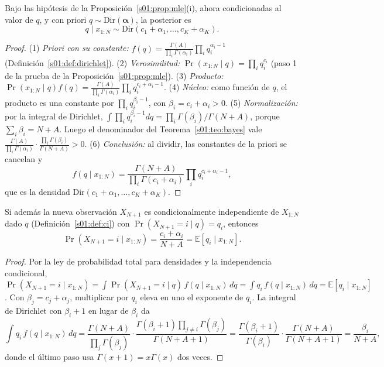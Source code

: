 \begin{proposicion}\label{s01:prop:conjugacion}
Bajo las hipótesis de la Proposición~\ref{s01:prop:mle}(i), ahora condicionadas al
valor de $q$, y con priori $q\sim\mathrm{Dir}(\boldsymbol\alpha)$, la posterior es
\[
q\mid x_{1:N}\sim\mathrm{Dir}(c_1+\alpha_1,\ldots,c_K+\alpha_K).
\]
\end{proposicion}
\begin{proof}
(1) \emph{Priori con su constante:}
$f(q)=\frac{\Gamma(A)}{\prod_i\Gamma(\alpha_i)}\prod_iq_i^{\alpha_i-1}$
(Definición~\ref{s01:def:dirichlet}).
(2) \emph{Verosimilitud:} $\Pr(x_{1:N}\mid q)=\prod_iq_i^{c_i}$ (paso 1 de la
prueba de la Proposición~\ref{s01:prop:mle}).
(3) \emph{Producto:}
$\Pr(x_{1:N}\mid q)f(q)=\frac{\Gamma(A)}{\prod_i\Gamma(\alpha_i)}\prod_iq_i^{c_i+\alpha_i-1}$.
(4) \emph{Núcleo:} como función de $q$, el producto es una constante por
$\prod_iq_i^{\beta_i-1}$, con $\beta_i=c_i+\alpha_i>0$.
(5) \emph{Normalización:} por la integral de Dirichlet,
$\int\prod_iq_i^{\beta_i-1}dq=\prod_i\Gamma(\beta_i)/\Gamma(N+A)$, porque
$\sum_i\beta_i=N+A$. Luego el denominador del Teorema~\ref{s01:teo:bayes} vale
$\frac{\Gamma(A)}{\prod_i\Gamma(\alpha_i)}\cdot\frac{\prod_i\Gamma(\beta_i)}{\Gamma(N+A)}>0$.
(6) \emph{Conclusión:} al dividir, las constantes de la priori se cancelan y
\[
f(q\mid x_{1:N})=\frac{\Gamma(N+A)}{\prod_i\Gamma(c_i+\alpha_i)}\prod_iq_i^{c_i+\alpha_i-1},
\]
que es la densidad $\mathrm{Dir}(c_1+\alpha_1,\ldots,c_K+\alpha_K)$.
\end{proof}
\begin{proposicion}\label{s01:prop:predictiva}
Si además la nueva observación $X_{N+1}$ es condicionalmente independiente de
$X_{1:N}$ dado $q$ (Definición~\ref{s01:def:ci}) con $\Pr(X_{N+1}=i\mid q)=q_i$,
entonces
\[
\boxed{\Pr(X_{N+1}=i\mid x_{1:N})=\frac{c_i+\alpha_i}{N+A}=\mathbb E[q_i\mid x_{1:N}].}
\]
\end{proposicion}
\begin{proof}
Por la ley de probabilidad total para densidades y la independencia condicional,
$\Pr(X_{N+1}=i\mid x_{1:N})=\int\Pr(X_{N+1}=i\mid q)\,f(q\mid x_{1:N})\,dq=\int
q_i\,f(q\mid x_{1:N})\,dq=\mathbb E[q_i\mid x_{1:N}]$. Con $\beta_j=c_j+\alpha_j$,
multiplicar por $q_i$ eleva en uno el exponente de $q_i$. La integral de Dirichlet
con $\beta_i+1$ en lugar de $\beta_i$ da
\[
\int q_i\,f(q\mid x_{1:N})\,dq
=\frac{\Gamma(N+A)}{\prod_j\Gamma(\beta_j)}\cdot
\frac{\Gamma(\beta_i+1)\prod_{j\ne i}\Gamma(\beta_j)}{\Gamma(N+A+1)}
=\frac{\Gamma(\beta_i+1)}{\Gamma(\beta_i)}\cdot\frac{\Gamma(N+A)}{\Gamma(N+A+1)}
=\frac{\beta_i}{N+A},
\]
donde el último paso usa $\Gamma(x+1)=x\Gamma(x)$ dos veces.
\end{proof}
